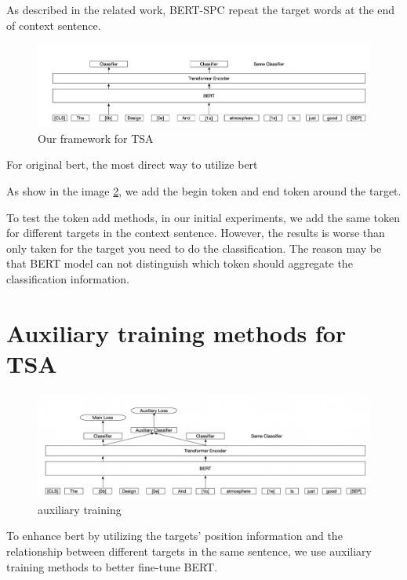 \documentclass[fyp]{socreport}
\begin{document}
As described in the related work, BERT-SPC \cite{Song2019} repeat the target words at the end of context sentence. 

\begin{figure}[h]
    \centering
    \includegraphics[width=\linewidth]{./image/Framework.png}
    \caption{Our framework for TSA}
  \label{Framework}
\end{figure}

For original bert, the most direct way to utilize bert

As show in the image \ref{Framework}, we add the begin token and end token around the target. 

To test the token add methods, in our initial experiments, we add the same token for different targets in the context sentence. However, the results is worse than only taken for the target you need to do the classification. The reason may be that BERT model can not distinguish which token should aggregate the classification information.





\section{Auxiliary training methods for TSA}

\begin{figure}[h]
    \centering
    \includegraphics[width=\linewidth]{./image/aux.png}
    \caption{auxiliary training}
  \label{Framework}
\end{figure}


To enhance bert by utilizing the targets' position information and the relationship between different targets in the same sentence, we use auxiliary training methods to better fine-tune BERT.
\end{document}
